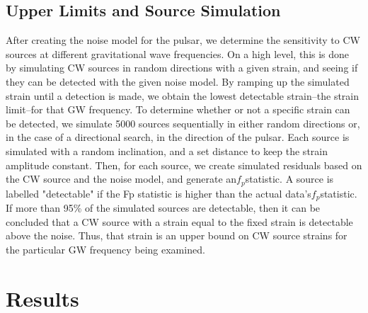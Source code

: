 \documentclass[12pt]{article}
\begin{document}
\subsection{Upper Limits and Source Simulation}

After creating the noise model for the pulsar, we determine the sensitivity to
CW sources at different gravitational wave frequencies. On a high level, this
is done by simulating CW sources in random directions with a given strain, and
seeing if they can be detected with the given noise model. By ramping up the
simulated strain until a detection is made, we obtain the lowest detectable
strain--the strain limit--for that GW frequency. To determine whether or not a
specific strain can be detected, we simulate 5000 sources sequentially in
either random directions or, in the case of a directional search, in the
direction of the pulsar. Each source is simulated with a random inclination,
and a set distance to keep the strain amplitude constant. Then, for each
source, we create simulated residuals based on the CW source and the noise
model, and generate an$f_p$statistic. A source is labelled "detectable" if the
Fp statistic is higher than the actual data's$f_p$statistic. If more than 95\% of
the simulated sources are detectable, then it can be concluded that a CW source
with a strain equal to the fixed strain is detectable above the noise. Thus,
that strain is an upper bound on CW source strains for the particular GW
frequency being examined.

\section{Results}
\end{document}
